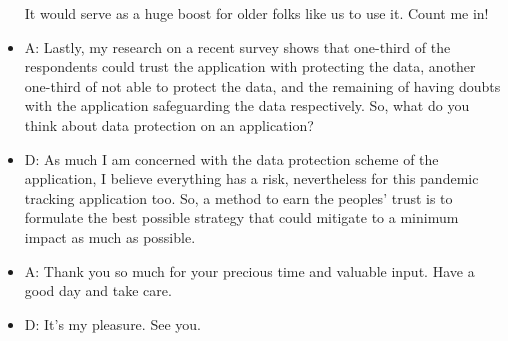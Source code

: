 \begin{appendices}
\begin{itemize}
        It would serve as a huge boost for older folks like us to use it. Count me in!
        \item A: Lastly, my research on a recent survey shows that one-third of the respondents could trust the
        application with protecting the data, another one-third of not able to protect the data, and the
        remaining of having doubts with the application safeguarding the data respectively. So, what
        do you think about data protection on an application?
        \item D: As much I am concerned with the data protection scheme of the application, I believe
        everything has a risk, nevertheless for this pandemic tracking application too. So, a method to
        earn the peoples’ trust is to formulate the best possible strategy that could mitigate to a minimum
        impact as much as possible.
        \item A: Thank you so much for your precious time and valuable input. Have a good day and take care.
        \item D: It’s my pleasure. See you.
      \end{itemize}

\end{appendices}